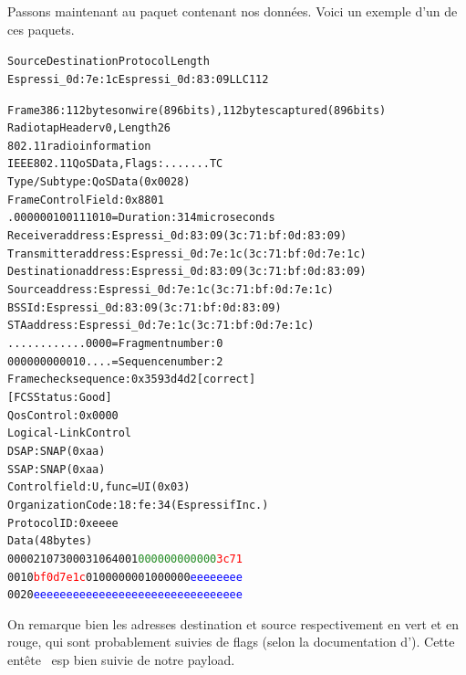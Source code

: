             Passons maintenant au paquet contenant nos données. Voici un exemple d'un de ces paquets.
            \begin{alltt}
Source                Destination           Protocol Length
Espressi_0d:7e:1c     Espressi_0d:83:09     LLC      112   
            
Frame 386: 112 bytes on wire (896 bits), 112 bytes captured (896 bits)
Radiotap Header v0, Length 26
802.11 radio information
IEEE 802.11 QoS Data, Flags: .......TC
    Type/Subtype: QoS Data (0x0028)
    Frame Control Field: 0x8801
    .000 0001 0011 1010 = Duration: 314 microseconds
    Receiver address: Espressi_0d:83:09 (3c:71:bf:0d:83:09)
    Transmitter address: Espressi_0d:7e:1c (3c:71:bf:0d:7e:1c)
    Destination address: Espressi_0d:83:09 (3c:71:bf:0d:83:09)
    Source address: Espressi_0d:7e:1c (3c:71:bf:0d:7e:1c)
    BSS Id: Espressi_0d:83:09 (3c:71:bf:0d:83:09)
    STA address: Espressi_0d:7e:1c (3c:71:bf:0d:7e:1c)
    .... .... .... 0000 = Fragment number: 0
    0000 0000 0010 .... = Sequence number: 2
    Frame check sequence: 0x3593d4d2 [correct]
    [FCS Status: Good]
    Qos Control: 0x0000
Logical-Link Control
    DSAP: SNAP (0xaa)
    SSAP: SNAP (0xaa)
    Control field: U, func=UI (0x03)
    Organization Code: 18:fe:34 (Espressif Inc.)
    Protocol ID: 0xeeee
Data (48 bytes)
0000  21 07 30 00 31 06 40 01 \textcolor{ForestGreen}{00 00 00 00 00 00} \textcolor{red}{3c 71}
0010  \textcolor{red}{bf 0d 7e 1c} 01 00 00 00 01 00 00 00 \textcolor{blue}{ee ee ee ee}
0020  \textcolor{blue}{ee ee ee ee ee ee ee ee ee ee ee ee ee ee ee ee}
            \end{alltt}
            On remarque bien les adresses destination et source respectivement en vert et en rouge,
            qui sont probablement suivies de flags (selon la documentation d'\espmesh). Cette entête
            \espmesh\ esp bien suivie de notre payload.
 
